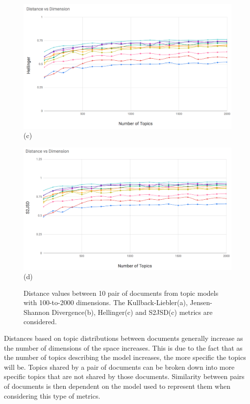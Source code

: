 \begin{figure}
\begin{center}
\begin{adjustbox}{minipage=0.45\linewidth,frame=0pt 3pt}
\end{adjustbox}
\hfill
\begin{adjustbox}{minipage=0.45\linewidth,frame=0pt 3pt}
\includegraphics[width=\linewidth]{He_100_2k.png}
\centering (c)
\end{adjustbox}
\hfill
\begin{adjustbox}{minipage=0.45\linewidth,frame=0pt 3pt}
\includegraphics[width=\linewidth]{S2JSD_100_2k.png}
\centering (d)
\end{adjustbox}
\end{center}
\caption{Distance values between 10 pair of documents from topic models with 100-to-2000 dimensions. The Kullback-Liebler(a), Jensen-Shannon Divergence(b), Hellinger(c) and S2JSD(c) metrics are considered.}
\label{fig:topic_distances}
\end{figure}

Distances based on topic distributions between documents generally increase as the number of dimensions of the space increases. This is due to the fact that as the number of topics describing the model increases, the more specific the topics will be. Topics shared by a pair of documents can be broken down into more specific topics that are not shared by those documents. Similarity between pairs of documents is then dependent on the model used to represent them when considering this type of metrics. 

